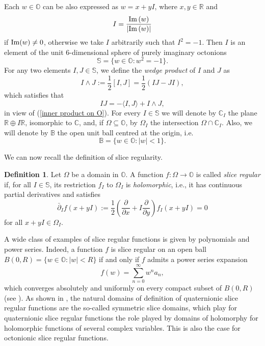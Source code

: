 \documentclass{amsart}
\theoremstyle{definition}
\newtheorem{definition}[theorem]{Definition}
\theoremstyle{remark}
\numberwithin{equation}{section}
\begin{document}
Each $w\in \mathbb O$ can be also expressed as $w = x + yI$, where $x, y \in \mathbb R$ and
$$I=\dfrac{{\rm{Im}}\, (w)}{|{\rm{Im}}\, (w)|}$$
 if ${\rm{Im}}(w)\neq 0$, otherwise we take $I$ arbitrarily such that $I^2=-1$.
Then $I $ is an element of the unit 6-dimensional sphere of purely imaginary octonions
$$\mathbb S=\big\{w \in \mathbb O:w^2 =-1\big\}.$$
For any two elements $I, J\in\mathbb S$, we define the \textit{wedge product} of $I$ and $J$ as
$$I\wedge J:=\frac12[I, J]=\frac12(IJ-JI),$$
which satisfies that
\begin{equation}\label{relation-inner-wedge}
IJ=-\langle I,J\rangle+I\wedge J,
\end{equation}
in view of (\ref{inner product on O}).
For every $I \in \mathbb S $ we will denote by $\mathbb C_I$ the plane $ \mathbb R \oplus I\mathbb R $, isomorphic to $ \mathbb C$, and, if $\Omega \subseteq \mathbb O$, by $\Omega_I$ the intersection $ \Omega \cap \mathbb C_I $. Also, we will denote by $\mathbb B$ the open unit ball centred at the origin, i.e.
$$\mathbb B=\big\{w \in \mathbb O:|w|<1\big\}.$$

We can now recall the definition of slice regularity.

\begin{definition} \label{de: regular} Let $\Omega$ be a domain in $\mathbb O$. A function $f :\Omega \rightarrow \mathbb O$ is called \emph{slice regular} if, for all $ I \in \mathbb S$, its restriction $f_I$ to $\Omega_I$ is \emph{holomorphic}, i.e., it has continuous partial derivatives and satisfies
$$\bar{\partial}_I f(x+yI):=\frac{1}{2}\left(\frac{\partial}{\partial x}+I\frac{\partial}{\partial y}\right)f_I (x+yI)=0$$
for all $x+yI\in \Omega_I $.
\end{definition}

A wide class of examples of slice regular functions is given by polynomials and power series. Indeed, a function $f$ is slice regular on an  open   ball $B(0,R)=\big\{w \in \mathbb O: |w|<R\big\}$ if and only if $f$ admits a power series expansion
\begin{equation}\label{Taylor expansion on ball}
f(w)=\sum_{n=0}^{\infty}w^na_n,
\end{equation}
which converges absolutely and uniformly on every compact subset of $B(0,R)$ (see \cite{GS50}).
As shown in \cite{CGSS}, the natural   domains of definition  of quaternionic slice regular functions are the  so-called  symmetric slice domains, which play
for quaternionic slice regular functions the role played by domains of holomorphy for holomorphic functions of several complex variables. This is also the case for octonionic slice regular functions.
\end{document}
